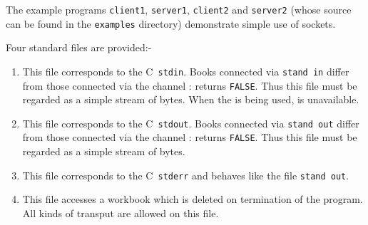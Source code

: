 \begin{enumerate}
The example programs \verb|client1|, \verb|server1|, \verb|client2|
and \verb|server2| (whose source can be found in the \verb|examples|
directory) demonstrate simple use of sockets.
\end{enumerate}

Four standard files are provided:-
\begin{enumerate}
\item {}\newline
This file corresponds to the C~\verb|stdin|. Books connected via
\verb|stand in| differ from those connected via the channel
:  returns \verb|FALSE|. Thus
this file must be regarded as a simple stream of bytes. When the
 is being used,  is unavailable.
\item {}\newline
This file corresponds to the C~\verb|stdout|. Books connected via
\verb|stand out| differ from those connected via the channel
:  returns \verb|FALSE|.
Thus this file must be regarded as a simple stream of bytes.
\item {}\newline
This file corresponds to the C~\verb|stderr| and behaves like the file
\verb|stand out|.
\item {}\newline
This file accesses a workbook which is deleted on termination of the
program. All kinds of transput are allowed on this file.
\end{enumerate}

